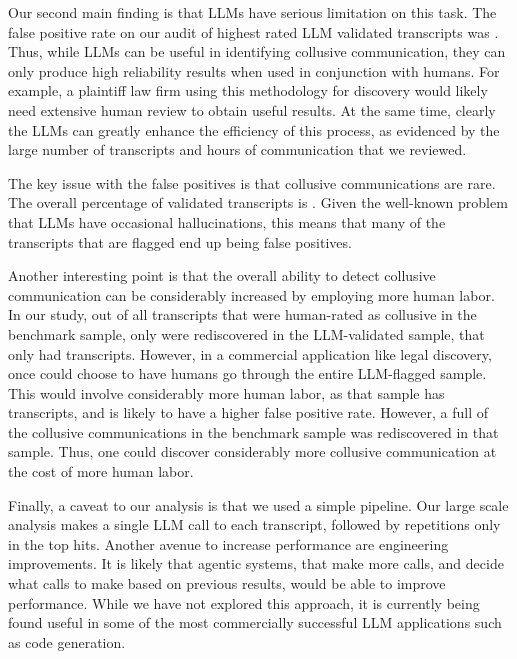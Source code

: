Our second main finding is that LLMs have serious limitation on this task. The false positive rate on our audit of highest rated LLM validated transcripts was . Thus, while LLMs can be useful in identifying collusive communication, they can only produce high reliability results when used in conjunction with humans. For example, a plaintiff law firm using this methodology for discovery would likely need extensive human review to obtain useful results. At the same time, clearly the LLMs can greatly enhance the efficiency of this process, as evidenced by the large number of transcripts and hours of communication that we reviewed.

The key issue with the false positives is that collusive communications are rare. The overall percentage of validated transcripts is . Given the well-known problem that LLMs have occasional hallucinations, this means that many of the transcripts that are flagged end up being false positives.

Another interesting point is that the overall ability to detect collusive communication can be considerably increased by employing more human labor. In our study, out of all transcripts that were human-rated as collusive in the benchmark sample, only  were rediscovered in the LLM-validated sample, that only had  transcripts. However, in a commercial application like legal discovery, once could choose to have humans go through the entire LLM-flagged sample. This would involve considerably more human labor, as that sample has  transcripts, and is likely to have a higher false positive rate. However, a full  of the collusive communications in the benchmark sample was rediscovered in that sample. Thus, one could discover considerably more collusive communication at the cost of more human labor.

Finally, a caveat to our analysis is that we used a simple pipeline. Our large scale analysis makes a single LLM call to each transcript, followed by repetitions only in the top hits. Another avenue to increase performance are engineering improvements. It is likely that agentic systems, that make more calls, and decide what calls to make based on previous results, would be able to improve performance. While we have not explored this approach, it is currently being found useful in some of the most commercially successful LLM applications such as code generation.